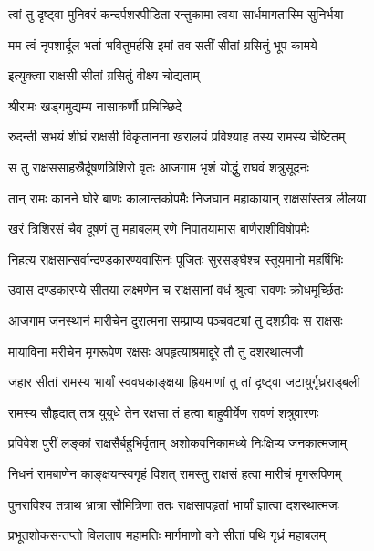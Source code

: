 \twolineshloka
{त्वां तु दृष्ट्वा मुनिवरं कन्दर्पशरपीडिता}
{रन्तुकामा त्वया सार्धमागतास्मि सुनिर्भया}%

\twolineshloka
{मम त्वं नृपशार्दूल भर्ता भवितुमर्हसि}
{इमां तव सतीं सीतां ग्रसितुं भूप कामये}%



\onelineshloka
{इत्युक्त्वा राक्षसी सीतां ग्रसितुं वीक्ष्य चोद्यताम्}%

\onelineshloka
{श्रीरामः खड्गमुद्यम्य नासाकर्णौ प्रचिच्छिदे}%

\twolineshloka
{रुदन्ती सभयं शीघ्रं राक्षसी विकृतानना}
{खरालयं प्रविश्याह तस्य रामस्य चेष्टितम्}%

\twolineshloka
{स तु राक्षससाहस्रैर्दूषणत्रिशिरो वृतः}
{आजगाम भृशं योद्धुं राघवं शत्रुसूदनः}%

\twolineshloka
{तान् रामः कानने घोरे बाणः कालान्तकोपमैः}
{निजघान महाकायान् राक्षसांस्तत्र लीलया}%

\twolineshloka
{खरं त्रिशिरसं चैव दूषणं तु महाबलम्}
{रणे निपातयामास बाणैराशीविषोपमैः}%

\twolineshloka
{निहत्य राक्षसान्सर्वान्दण्डकारण्यवासिनः}
{पूजितः सुरसङ्घैश्च स्तूयमानो महर्षिभिः}%

\twolineshloka
{उवास दण्डकारण्ये सीतया लक्ष्मणेन च}
{राक्षसानां वधं श्रुत्वा रावणः क्रोधमूर्च्छितः}%

\twolineshloka
{आजगाम जनस्थानं मारीचेन दुरात्मना}
{सम्प्राप्य पञ्चवट्यां तु दशग्रीवः स राक्षसः}%

\twolineshloka
{मायाविना मरीचेन मृगरूपेण रक्षसः}
{अपहृत्याश्रमाद्दूरे तौ तु दशरथात्मजौ}%

\twolineshloka
{जहार सीतां रामस्य भार्यां स्ववधकाङ्क्षया}
{ह्रियमाणां तु तां दृष्ट्वा जटायुर्गृध्रराड्बली}%

\twolineshloka
{रामस्य सौहृदात् तत्र युयुधे तेन रक्षसा}
{तं हत्वा बाहुवीर्येण रावणं शत्रुवारणः}%

\twolineshloka
{प्रविवेश पुरीं लङ्कां राक्षसैर्बहुभिर्वृताम्}
{अशोकवनिकामध्ये निःक्षिप्य जनकात्मजाम्}%

\twolineshloka
{निधनं रामबाणेन काङ्क्षयन्स्वगृहं विशत्}
{रामस्तु राक्षसं हत्वा मारीचं मृगरूपिणम्}%

\twolineshloka
{पुनराविश्य तत्राथ भ्रात्रा सौमित्रिणा ततः}
{राक्षसापहृतां भार्यां ज्ञात्वा दशरथात्मजः}%

\twolineshloka
{प्रभूतशोकसन्तप्तो विललाप महामतिः}
{मार्गमाणो वने सीतां पथि गृध्रं महाबलम्}%

